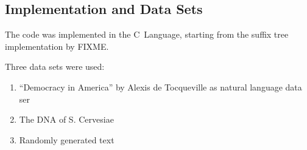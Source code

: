 \subsection{Implementation and Data Sets}

The code was implemented in the C~Language, starting from the suffix tree implementation by FIXME.

Three data sets were used:

\begin{enumerate}
\item ``Democracy in America'' by Alexis de Tocqueville as natural language data ser
\item The DNA of S. Cervesiae
\item Randomly generated text
\end{enumerate}


